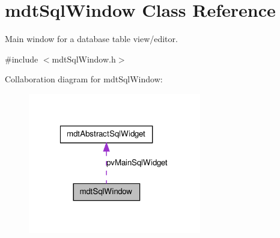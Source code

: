 \hypertarget{classmdt_sql_window}{
\section{mdtSqlWindow Class Reference}
\label{classmdt_sql_window}
}


Main window for a database table view/editor.  




{\ttfamily \#include $<$mdtSqlWindow.h$>$}



Collaboration diagram for mdtSqlWindow:\nopagebreak
\begin{figure}[H]
\begin{center}
\leavevmode
\includegraphics[width=214pt]{classmdt_sql_window__coll__graph}
\end{center}
\end{figure}
